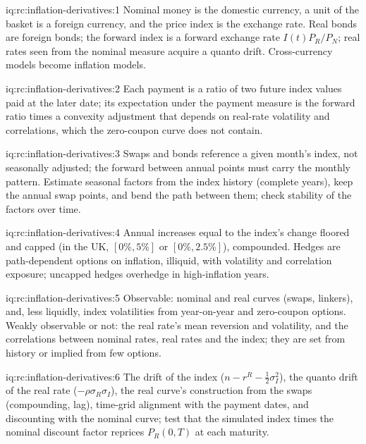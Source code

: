 \begin{solution}{iq:rc:inflation-derivatives:1}
Nominal money is the domestic currency, a unit of the basket is a foreign currency, and
the price index is the exchange rate. Real bonds are foreign bonds; the forward index is
a forward exchange rate $I(t)P_R/P_N$; real rates seen from the nominal measure acquire a
quanto drift. Cross-currency models become inflation models.
\end{solution}

\begin{solution}{iq:rc:inflation-derivatives:2}
Each payment is a ratio of two future index values paid at the later date; its
expectation under the payment measure is the forward ratio times a convexity adjustment
that depends on real-rate volatility and correlations, which the zero-coupon curve does
not contain.
\end{solution}

\begin{solution}{iq:rc:inflation-derivatives:3}
Swaps and bonds reference a given month's index, not seasonally adjusted; the forward
between annual points must carry the monthly pattern. Estimate seasonal factors from the
index history (complete years), keep the annual swap points, and bend the path between them;
check stability of the factors over time.
\end{solution}

\begin{solution}{iq:rc:inflation-derivatives:4}
Annual increases equal to the index's change floored and capped (in the UK, $[0\%,5\%]$ or
$[0\%,2.5\%]$), compounded. Hedges are path-dependent options on inflation, illiquid, with
volatility and correlation exposure; uncapped hedges overhedge in high-inflation years.
\end{solution}

\begin{solution}{iq:rc:inflation-derivatives:5}
Observable: nominal and real curves (swaps, linkers), and, less liquidly, index
volatilities from year-on-year and zero-coupon options. Weakly observable or not: the real
rate's mean reversion and volatility, and the correlations between nominal rates, real
rates and the index; they are set from history or implied from few options.
\end{solution}

\begin{solution}{iq:rc:inflation-derivatives:6}
The drift of the index ($n-r^R-\frac12\sigma_I^2$), the quanto drift of the real rate
($-\rho\sigma_R\sigma_I$), the real curve's construction from the swaps (compounding,
lag), time-grid alignment with the payment dates, and discounting with the nominal curve;
test that the simulated index times the nominal discount factor reprices $P_R(0,T)$ at each
maturity.
\end{solution}
